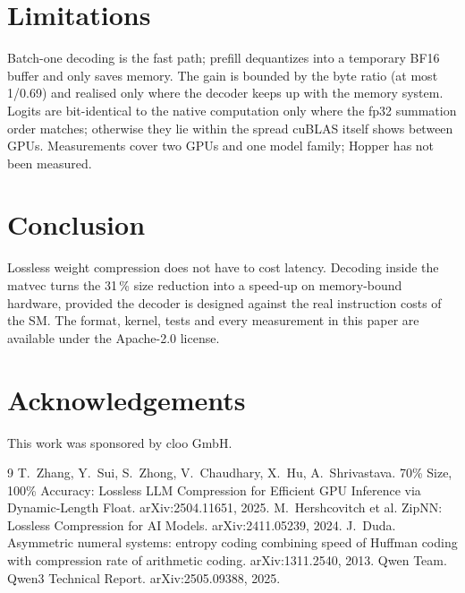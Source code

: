 \documentclass[11pt]{article}
\begin{document}
\section{Limitations}

Batch-one decoding is the fast path; prefill dequantizes into a temporary BF16 buffer and only saves
memory. The gain is bounded by the byte ratio (at most 1/0.69) and realised only where the decoder keeps
up with the memory system. Logits are bit-identical to the native computation only where the fp32
summation order matches; otherwise they lie within the spread cuBLAS itself shows between GPUs.
Measurements cover two GPUs and one model family; Hopper has not been measured.

\section{Conclusion}

Lossless weight compression does not have to cost latency. Decoding inside the matvec turns the 31\,\%
size reduction into a speed-up on memory-bound hardware, provided the decoder is designed against the
real instruction costs of the SM. The format, kernel, tests and every measurement in this paper are
available under the Apache-2.0 license.

\section*{Acknowledgements}
This work was sponsored by cloo GmbH.

\begin{thebibliography}{9}
 T.~Zhang, Y.~Sui, S.~Zhong, V.~Chaudhary, X.~Hu, A.~Shrivastava. 70\% Size, 100\% Accuracy:
Lossless LLM Compression for Efficient GPU Inference via Dynamic-Length Float. arXiv:2504.11651, 2025.
 M.~Hershcovitch et al. ZipNN: Lossless Compression for AI Models. arXiv:2411.05239, 2024.
 J.~Duda. Asymmetric numeral systems: entropy coding combining speed of Huffman coding with
compression rate of arithmetic coding. arXiv:1311.2540, 2013.
 Qwen Team. Qwen3 Technical Report. arXiv:2505.09388, 2025.
\end{thebibliography}
\end{document}
